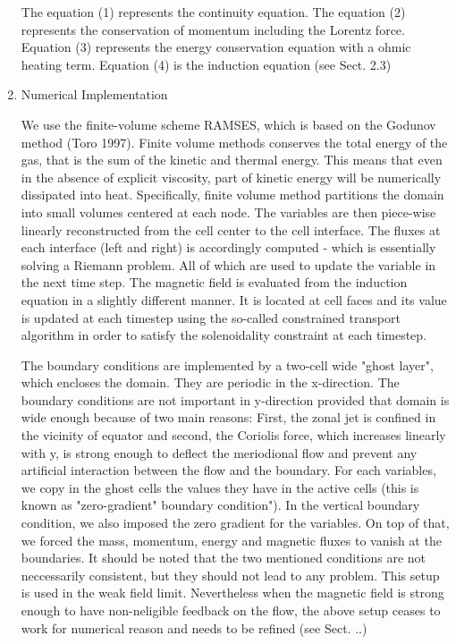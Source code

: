 \documentclass[11pt]{article}
\begin{document}
\begin{enumerate}
The equation (1) represents the continuity equation. The equation (2) represents the conservation of momentum including the Lorentz force.  Equation (3) represents the energy conservation equation with a ohmic heating term. Equation (4) is the induction equation (see Sect. 2.3)

\item Numerical Implementation 

We use the finite-volume scheme RAMSES, which is based on the Godunov method (Toro 1997). Finite volume methods conserves the total energy of the gas, that is the sum of the kinetic and thermal energy. This means that even in the absence of explicit viscosity, part of kinetic energy will be numerically dissipated into heat.
Specifically, finite volume method partitions the domain into small volumes centered at each node. The variables are then piece-wise linearly reconstructed from the cell center to the cell interface. The fluxes at each interface (left and right) is accordingly computed - which is essentially solving a Riemann problem. All of which are used to update the variable in the next time step. The magnetic field is evaluated from the induction equation in a slightly different manner. It is located at cell faces and its value is updated at each timestep using the so-called constrained transport algorithm in order to satisfy the solenoidality constraint at each timestep.

The boundary conditions are implemented by a two-cell wide "ghost layer", which encloses the domain. They are periodic in the x-direction. The boundary conditions are not important in y-direction provided that domain is wide enough because of two main reasons: First, the zonal jet is confined in the vicinity of equator and second, the Coriolis force, which increases linearly with y, is strong enough to deflect the meriodional flow and prevent any artificial interaction between the flow and the boundary. For each variables, we copy in the ghost cells the values they have in the active cells (this is known as "zero-gradient" boundary condition"). In the vertical boundary condition, we also imposed the zero gradient for the variables. On top of that, we forced the mass, momentum, energy and magnetic fluxes to vanish at the boundaries. It should be noted that the two mentioned conditions are not neccessarily consistent, but they should not lead to any problem. This setup is used in the weak field limit. Nevertheless when the magnetic field is strong enough to have non-neligible feedback on the flow, the above setup ceases to work for numerical reason and needs to be refined (see Sect. ..)


\end{enumerate}
\end{document}
